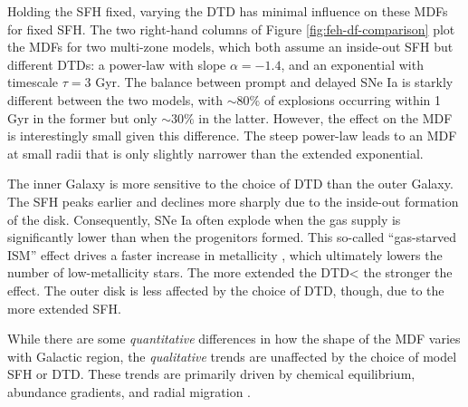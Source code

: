 \documentclass[twocolumn,twocolappendix,linenumbers,trackchanges]{aastex631}
\begin{document}
Holding the SFH fixed, varying the DTD has minimal influence on these MDFs for fixed SFH. The two right-hand columns of Figure \ref{fig:feh-df-comparison} plot the MDFs for two multi-zone models, which both assume an inside-out SFH but different DTDs: a power-law with slope $\alpha=-1.4$, and an exponential with timescale $\tau=3$ Gyr. The balance between prompt and delayed SNe Ia is starkly different between the two models, with $\sim 80\%$ of explosions occurring within 1 Gyr in the former but only $\sim 30\%$ in the latter. 
However, the effect on the MDF is interestingly small given this difference. The steep power-law leads to an MDF at small radii that is only slightly narrower than the extended exponential.

The inner Galaxy is more sensitive to the choice of DTD than the outer Galaxy. The SFH peaks earlier and declines more sharply due to the inside-out formation of the disk. Consequently, SNe Ia often explode when the gas supply is significantly lower than when the progenitors formed. This so-called ``gas-starved ISM'' effect drives a faster increase in metallicity \citep[see analytic demonstration in][]{Weinberg2017-ChemicalEquilibrium}, which ultimately lowers the number of low-metallicity stars. The more extended the DTD< the stronger the effect. The outer disk is less affected by the choice of DTD, though, due to the more extended SFH.

While there are some {\it quantitative} differences in how the shape of the MDF varies with Galactic region, the {\it qualitative} trends are unaffected by the choice of model SFH or DTD. These trends are primarily driven by chemical equilibrium, abundance gradients, and radial migration .
\end{document}
